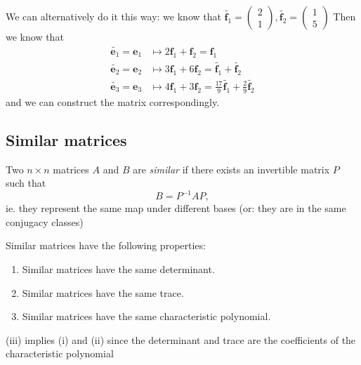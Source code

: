 \documentclass[a4paper]{article}
\begin{document}
\begin{eg}
    We can alternatively do it this way: we know that $\tilde{\mathbf{f}_1} = 
    \begin{pmatrix}
      2\\1
    \end{pmatrix}, \tilde{\mathbf{f}_2} = 
    \begin{pmatrix}
      1\\5
    \end{pmatrix}$
    Then we know that 
    \begin{align*}
      \tilde{\mathbf{e}_1} = \mathbf{e}_1 &\mapsto 2\mathbf{f}_1 + \mathbf{f}_2 = \mathbf{f}_1\\
      \tilde{\mathbf{e}_2} = \mathbf{e}_2 &\mapsto 3\mathbf{f}_1 + 6\mathbf{f}_2 = \tilde{\mathbf{f}_1} + \tilde{\mathbf{f}_2}\\
      \tilde{\mathbf{e}_3} = \mathbf{e}_3 &\mapsto 4\mathbf{f}_1 + 3\mathbf{f}_2 = \frac{17}{9} \tilde{\mathbf{f}_1} + \frac{2}{9}\tilde{\mathbf{f}_2}
    \end{align*}
    and we can construct the matrix correspondingly.
  \end{eg}
  \subsection{Similar matrices}
  \begin{defi}
    Two $n\times n$ matrices $A$ and $B$ are \emph{similar} if there exists an invertible matrix $P$ such that
    \[
      B = P^{-1}AP,
    \]
    ie. they represent the same map under different bases (or: they are in the same conjugacy classes)
  \end{defi}

  \begin{prop}
    Similar matrices have the following properties:
    \begin{enumerate}
      \item Similar matrices have the same determinant.
      \item Similar matrices have the same trace.
      \item Similar matrices have the same characteristic polynomial.
    \end{enumerate}
  \end{prop}
  \note (iii) implies (i) and (ii) since the determinant and trace are the coefficients of the characteristic polynomial
\end{document}
